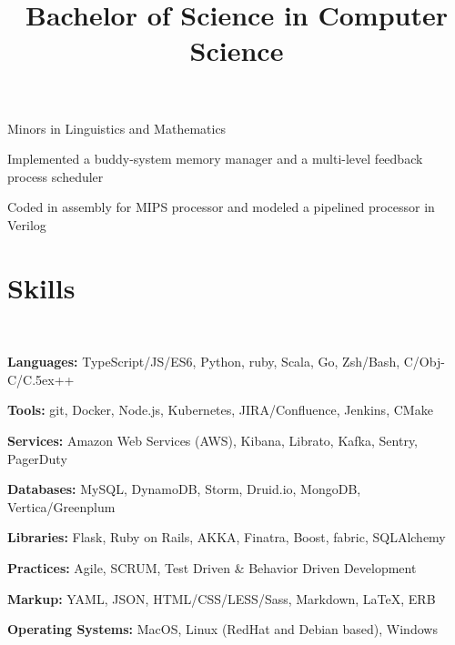 \documentclass[12pt, tweaklist, line]{res}
\let\tempone\itemize
\let\temptwo\enditemize
\renewenvironment{itemize}{\tempone\vspace{-.15in}\setlength{\topsep}{0pt}\setlength{\itemsep}{3pt}\vspace{-.15in}}{\temptwo}
\def\Cplusplus{{\rm C\raise.5ex\hbox{\small ++}}}
\begin{document}
\begin{resume}
\title{Bachelor of Science in Computer Science}
\begin{position}
\begin{itemize}
\item Minors in Linguistics and Mathematics
\item Implemented a buddy-system memory manager and a multi-level feedback process scheduler
\item Coded in assembly for MIPS processor and modeled a pipelined processor in Verilog
\end{itemize}
\end{position}

\section{Skills}

~\\ %

\begin{itemize}
\item \textbf{Languages:} TypeScript/JS/ES6, Python, ruby, Scala, Go, Zsh/Bash, C/Obj-C/\Cplusplus
\item \textbf{Tools:} git, Docker, Node.js, Kubernetes, JIRA/Confluence, Jenkins, CMake
\item \textbf{Services:} Amazon Web Services (AWS), Kibana, Librato, Kafka, Sentry, PagerDuty
\item \textbf{Databases:} MySQL, DynamoDB, Storm, Druid.io, MongoDB, Vertica/Greenplum
\item \textbf{Libraries:} Flask, Ruby on Rails, AKKA, Finatra, Boost, fabric, SQLAlchemy
\item \textbf{Practices:} Agile, SCRUM, Test Driven \& Behavior Driven Development
\item \textbf{Markup:} YAML, JSON, HTML/CSS/LESS/Sass, Markdown, \LaTeX, ERB
\item \textbf{Operating Systems:} MacOS, Linux (RedHat and Debian based), Windows
\end{itemize}


\end{resume}
\end{document}
